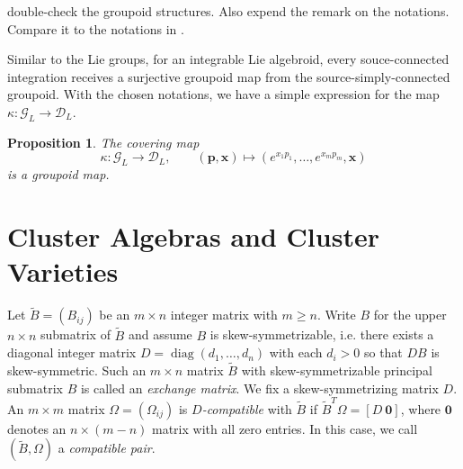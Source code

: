\documentclass{amsart}
\newtheorem{proposition}[theorem]{Proposition}
\newcommand{\bfp}{\mathbf{p}}
\newcommand{\bfx}{\mathbf{x}}
\newcommand{\cG}{\mathcal{G}}
\newcommand{\cD}{\mathcal{D}}
\newcommand{\diag}{\operatorname{diag}}
\begin{document}
{\color{red} double-check the groupoid structures. Also expend the remark on the notations. Compare it to the notations in \cite{MR2470108}.}

Similar to the Lie groups, for an integrable Lie algebroid, every souce-connected integration receives a surjective groupoid map from the source-simply-connected groupoid. With the chosen notations, we have a simple expression for the map $\kappa: \cG_L \to \cD_L$.

\begin{proposition}
The covering map
$$
	\kappa: \cG_L \to \cD_L, \qquad (\bfp, \bfx) \mapsto (e^{x_1p_1}, \ldots, e^{x_mp_m}, \bfx)
$$
is a groupoid map.
\end{proposition}


\section{Cluster Algebras and Cluster Varieties}
\label{sec:cluster}

Let $\tilde B=(B_{ij})$ be an $m\times n$ integer matrix with $m\ge n$.  
Write $B$ for the upper $n\times n$ submatrix of $\tilde B$ and assume $B$ is skew-symmetrizable, i.e. there exists a diagonal integer matrix $D=\diag(d_1,\ldots,d_n)$ with each $d_i>0$ so that $DB$ is skew-symmetric. 
Such an $m\times n$ matrix $\tilde B$ with skew-symmetrizable principal submatrix $B$ is called an \emph{exchange matrix}.
We fix a skew-symmetrizing matrix $D$.
An $m\times m$ matrix $\Omega=(\Omega_{ij})$ is \emph{$D$-compatible} with $\tilde B$ if $\tilde B^T\Omega=[D\ \boldsymbol{0}]$, where $\boldsymbol{0}$ denotes an $n\times(m-n)$ matrix with all zero entries.
In this case, we call $(\tilde B,\Omega)$ a \emph{compatible pair}.
\end{document}
